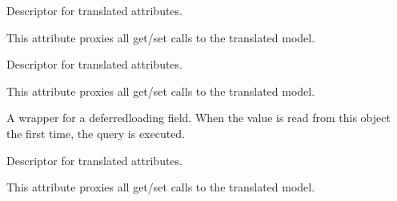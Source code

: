 \documentclass[letterpaper,10pt,french]{sphinxmanual}
\begin{document}
\begin{fulllineitems}
\begin{fulllineitems}
\label{\detokenize{index:bookings.models.SupplementMobileHome.bed_linen_rental}}
\pysigstartsignatures
\pysigline
{}
\pysigstopsignatures
\sphinxAtStartPar
Descriptor for translated attributes.

\sphinxAtStartPar
This attribute proxies all get/set calls to the translated model.

\end{fulllineitems}


\begin{fulllineitems}
\label{\detokenize{index:bookings.models.SupplementMobileHome.cleaning_deposit}}
\pysigstartsignatures
\pysigline
{}
\pysigstopsignatures
\sphinxAtStartPar
Descriptor for translated attributes.

\sphinxAtStartPar
This attribute proxies all get/set calls to the translated model.

\end{fulllineitems}


\begin{fulllineitems}
\label{\detokenize{index:bookings.models.SupplementMobileHome.id}}
\pysigstartsignatures
\pysigline
{}
\pysigstopsignatures
\sphinxAtStartPar
A wrapper for a deferred\sphinxhyphen{}loading field. When the value is read from this
object the first time, the query is executed.

\end{fulllineitems}


\begin{fulllineitems}
\label{\detokenize{index:bookings.models.SupplementMobileHome.mobile_home_deposit}}
\pysigstartsignatures
\pysigline
{}
\pysigstopsignatures
\sphinxAtStartPar
Descriptor for translated attributes.

\sphinxAtStartPar
This attribute proxies all get/set calls to the translated model.

\end{fulllineitems}


\end{fulllineitems}
\end{document}
